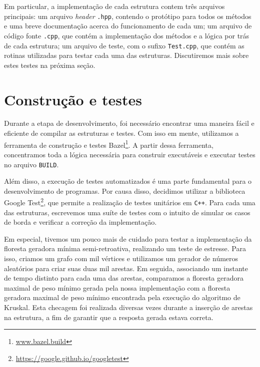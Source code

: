 Em particular, a implementação de cada estrutura contem três arquivos principais: um arquivo \emph{header} \texttt{.hpp}, contendo o protótipo para todos os métodos e uma breve documentação acerca do funcionamento de cada um; um arquivo de código fonte \texttt{.cpp}, que contém a implementação dos métodos e a lógica por trás de cada estrutura; um arquivo de teste, com o sufixo \texttt{Test.cpp}, que contém as rotinas utilizadas para testar cada uma das estruturas. Discutiremos mais sobre estes testes na próxima seção.

\section{Construção e testes}

Durante a etapa de desenvolvimento, foi necessário encontrar uma maneira fácil e eficiente de compilar as estruturas e testes. Com isso em mente, utilizamos a ferramenta de construção e testes Bazel\footnote{\url{www.bazel.build}}. A partir dessa ferramenta, concentramos toda a lógica necessária para construir executáveis e executar testes no arquivo \texttt{BUILD}.

Além disso, a execução de testes automatizados é uma parte fundamental para o desenvolvimento de programas. Por causa disso, decidimos utilizar a biblioteca Google Test\footnote{\url{https://google.github.io/googletest}}, que permite a realização de testes unitários em \texttt{C++}. Para cada uma das estruturas, escrevemos uma suíte de testes com o intuito de simular os casos de borda e verificar a correção da implementação.

Em especial, tivemos um pouco mais de cuidado para testar a implementação da floresta geradora mínima semi-retroativa, realizando um teste de estresse. Para isso, criamos um grafo com mil vértices e utilizamos um gerador de números aleatórios para criar suas duas mil arestas. Em seguida, associando um instante de tempo distinto para cada uma das arestas, comparamos a floresta geradora maximal de peso mínimo gerada pela nossa implementação com a floresta geradora maximal de peso mínimo encontrada pela execução do algoritmo de Kruskal. Esta checagem foi realizada diversas vezes durante a inserção de arestas na estrutura, a fim de garantir que a resposta gerada estava correta.